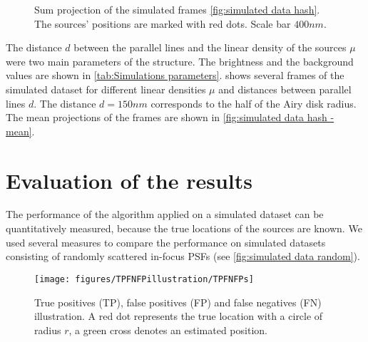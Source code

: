 \begin{figure}[!htb]	
	\newcommand{\widthfig}{.3\textwidth}	
	\centering	
	\hspace{.3cm}		
	\hspace{.3cm}	
	\caption{Sum projection of the simulated frames \autoref{fig:simulated data hash}. The sources' positions are marked with red dots. Scale bar $400 \unit{nm}$.}
	\label{fig:simulated data hash - mean}
\end{figure} 
%
The distance $d$ between the parallel lines and the linear density of the sources $\mu$ were two main parameters of the structure. The brightness and the background values are shown in \autoref{tab:Simulations parameters}.  shows several frames of the simulated dataset for different linear densities $\mu$ and distances between parallel lines $d$. The distance $d=150\unit{nm}$ corresponds to the half of the Airy disk radius. The mean projections of the frames are shown in \autoref{fig:simulated data hash - mean}.  
\afterpage{\clearpage}

\section{Evaluation of the results\label{sec:evaluation}}

The performance of the algorithm applied on a simulated dataset can be quantitatively measured, because the true locations of the sources are known. We used several measures to compare the performance on simulated datasets consisting of randomly scattered in-focus PSFs (see \autoref{fig:simulated data random}). 

\begin{figure}[!h]
	\centering
	\texttt{[image: figures/TPFNFPillustration/TPFNFPs]}
	\caption{True positives (TP), false positives (FP) and false negatives (FN) illustration. A red dot represents the true location with a circle of radius $r$, a green cross denotes an estimated position.}
	\label{fig:TPFPFN}
\end{figure}

